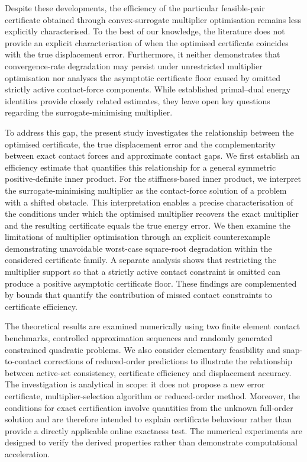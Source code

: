 Despite these developments, the efficiency of the particular feasible-pair certificate obtained through convex-surrogate multiplier optimisation
remains less explicitly characterised. To the best of our knowledge, the literature does not provide an explicit characterisation of when the
optimised certificate coincides with the true displacement error. Furthermore, it neither demonstrates that convergence-rate degradation may
persist under unrestricted multiplier optimisation nor analyses the asymptotic certificate floor caused by omitted strictly active contact-force
components. While established primal--dual energy identities provide closely related estimates, they leave open key questions regarding the
surrogate-minimising multiplier.

To address this gap, the present study investigates the relationship between the optimised certificate, the true displacement error and the
complementarity between exact contact forces and approximate contact gaps. We first establish an efficiency estimate that quantifies this relationship
for a general symmetric positive-definite inner product. For the stiffness-based inner product, we interpret the surrogate-minimising multiplier as
the contact-force solution of a problem with a shifted obstacle. This interpretation enables a precise characterisation of the conditions under
which the optimised multiplier recovers the exact multiplier and the resulting certificate equals the true energy error. We then examine the
limitations of multiplier optimisation through an explicit counterexample demonstrating unavoidable worst-case square-root degradation within the
considered certificate family. A separate analysis shows that restricting the multiplier support so that a strictly active contact constraint is
omitted can produce a positive asymptotic certificate floor. These findings are complemented by bounds that quantify the contribution of missed
contact constraints to certificate efficiency.

The theoretical results are examined numerically using two finite element contact benchmarks, controlled approximation sequences and randomly
generated constrained quadratic problems. We also consider elementary feasibility and snap-to-contact corrections of reduced-order predictions to
illustrate the relationship between active-set consistency, certificate efficiency and displacement accuracy. The investigation is analytical in
scope: it does not propose a new error certificate, multiplier-selection algorithm or reduced-order method. Moreover, the conditions for exact
certification involve quantities from the unknown full-order solution and are therefore intended to explain certificate behaviour rather than
provide a directly applicable online exactness test. The numerical experiments are designed to verify the derived properties rather than demonstrate
computational acceleration.

